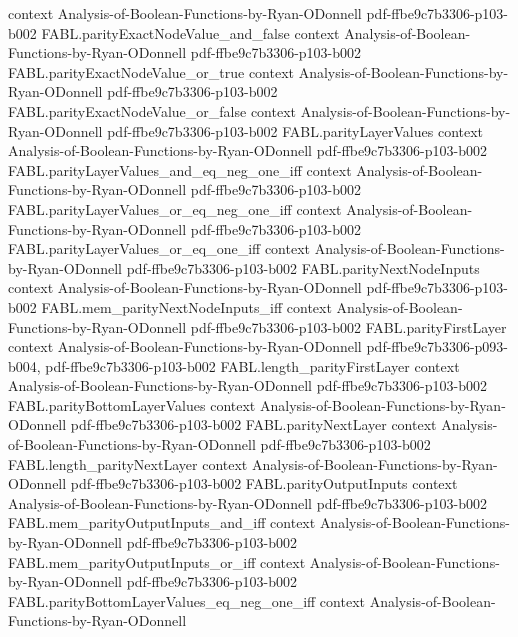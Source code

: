 \begin{theorem}
  {context}
  {Analysis-of-Boolean-Functions-by-Ryan-ODonnell}
  {pdf-ffbe9c7b3306-p103-b002}
\proofstep
  {FABL.parityExactNodeValue_and_false}
  {context}
  {Analysis-of-Boolean-Functions-by-Ryan-ODonnell}
  {pdf-ffbe9c7b3306-p103-b002}
\proofstep
  {FABL.parityExactNodeValue_or_true}
  {context}
  {Analysis-of-Boolean-Functions-by-Ryan-ODonnell}
  {pdf-ffbe9c7b3306-p103-b002}
\proofstep
  {FABL.parityExactNodeValue_or_false}
  {context}
  {Analysis-of-Boolean-Functions-by-Ryan-ODonnell}
  {pdf-ffbe9c7b3306-p103-b002}
\proofstep
  {FABL.parityLayerValues}
  {context}
  {Analysis-of-Boolean-Functions-by-Ryan-ODonnell}
  {pdf-ffbe9c7b3306-p103-b002}
\proofstep
  {FABL.parityLayerValues_and_eq_neg_one_iff}
  {context}
  {Analysis-of-Boolean-Functions-by-Ryan-ODonnell}
  {pdf-ffbe9c7b3306-p103-b002}
\proofstep
  {FABL.parityLayerValues_or_eq_neg_one_iff}
  {context}
  {Analysis-of-Boolean-Functions-by-Ryan-ODonnell}
  {pdf-ffbe9c7b3306-p103-b002}
\proofstep
  {FABL.parityLayerValues_or_eq_one_iff}
  {context}
  {Analysis-of-Boolean-Functions-by-Ryan-ODonnell}
  {pdf-ffbe9c7b3306-p103-b002}
\proofstep
  {FABL.parityNextNodeInputs}
  {context}
  {Analysis-of-Boolean-Functions-by-Ryan-ODonnell}
  {pdf-ffbe9c7b3306-p103-b002}
\proofstep
  {FABL.mem_parityNextNodeInputs_iff}
  {context}
  {Analysis-of-Boolean-Functions-by-Ryan-ODonnell}
  {pdf-ffbe9c7b3306-p103-b002}
\proofstep
  {FABL.parityFirstLayer}
  {context}
  {Analysis-of-Boolean-Functions-by-Ryan-ODonnell}
  {pdf-ffbe9c7b3306-p093-b004,
    pdf-ffbe9c7b3306-p103-b002}
\proofstep
  {FABL.length_parityFirstLayer}
  {context}
  {Analysis-of-Boolean-Functions-by-Ryan-ODonnell}
  {pdf-ffbe9c7b3306-p103-b002}
\proofstep
  {FABL.parityBottomLayerValues}
  {context}
  {Analysis-of-Boolean-Functions-by-Ryan-ODonnell}
  {pdf-ffbe9c7b3306-p103-b002}
\proofstep
  {FABL.parityNextLayer}
  {context}
  {Analysis-of-Boolean-Functions-by-Ryan-ODonnell}
  {pdf-ffbe9c7b3306-p103-b002}
\proofstep
  {FABL.length_parityNextLayer}
  {context}
  {Analysis-of-Boolean-Functions-by-Ryan-ODonnell}
  {pdf-ffbe9c7b3306-p103-b002}
\proofstep
  {FABL.parityOutputInputs}
  {context}
  {Analysis-of-Boolean-Functions-by-Ryan-ODonnell}
  {pdf-ffbe9c7b3306-p103-b002}
\proofstep
  {FABL.mem_parityOutputInputs_and_iff}
  {context}
  {Analysis-of-Boolean-Functions-by-Ryan-ODonnell}
  {pdf-ffbe9c7b3306-p103-b002}
\proofstep
  {FABL.mem_parityOutputInputs_or_iff}
  {context}
  {Analysis-of-Boolean-Functions-by-Ryan-ODonnell}
  {pdf-ffbe9c7b3306-p103-b002}
\proofstep
  {FABL.parityBottomLayerValues_eq_neg_one_iff}
  {context}
  {Analysis-of-Boolean-Functions-by-Ryan-ODonnell}

\end{theorem}
